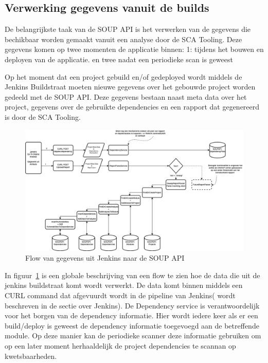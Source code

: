 \subsection{Verwerking gegevens vanuit de builds}\label{subsec:verwerking-gegevens-vanuit-de-sca}
De belangrijkste taak van de SOUP API is het verwerken van de gegevens die bechikbaar worden gemaakt vanuit een analyse door de SCA Tooling. Deze gegevens komen op twee momenten de applicatie binnen: 1: tijdens het bouwen en deployen van de applicatie. en twee nadat een periodieke scan is geweest

Op het moment dat een project gebuild en/of gedeployed wordt middels de Jenkins Buildstraat moeten nieuwe gegevens over het gebouwde project worden gedeeld met de SOUP API. Deze gegevens bestaan naast meta data over het project, gegevens over de gebruikte dependencies en een rapport dat gegenereerd is door de SCA Tooling.

\begin{figure}[bth]
  \myfloatalign
  \includegraphics[width=15cm]{gfx/SOUPAPI-ReportParseFlow}
  \caption{Flow van gegevens uit Jenkins naar de SOUP API}
  \label{fig:SOUP-ReportPArseFlow}
\end{figure}

In figuur~\ref{fig:SOUP-ReportPArseFlow} is een globale beschrijving van een flow te zien hoe de data die uit de jenkins buildstraat komt wordt verwerkt. De data komt binnen middels een CURL command dat afgevuurdt wordt in de pipeline van Jenkins( wordt beschreven in de sectie over Jenkins).
De Dependency service is verantwoordelijk voor het borgen van de dependency informatie. Hier wordt iedere keer als er een build/deploy is geweest de dependency informatie toegevoegd aan de betreffende module. Op deze manier kan de periodieke scanner deze informatie gebruiken om op een later moment herhaaldelijk de project dependencies te scannan op kwetsbaarheden.




